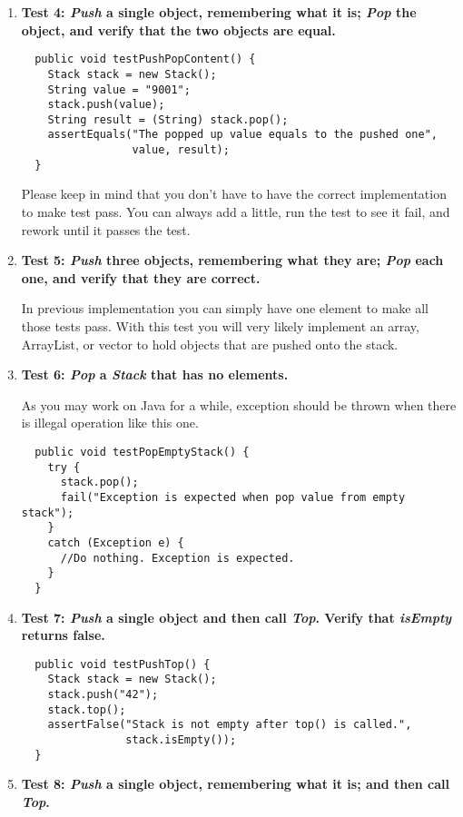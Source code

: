 \begin{enumerate}
\item {\textbf{Test 4: {\em Push} a single object, remembering what it is; {\em Pop} the object, and verify that the two objects are equal.}}

{\small\begin{verbatim}
  public void testPushPopContent() {	
    Stack stack = new Stack();
    String value = "9001";
    stack.push(value);
    String result = (String) stack.pop();
    assertEquals("The popped up value equals to the pushed one", 
                 value, result);
  }
\end{verbatim}}

Please keep in mind that you don't have to have the correct
implementation to make test pass. You can always add a little, run the
test to see it fail, and rework until it passes the test.

\item {\textbf{Test 5: {\em Push} three objects, remembering what they are; {\em Pop} each one, and verify that they are correct.}}

In previous implementation you can simply have one element to make all
those tests pass. With this test you will very likely implement an
array, ArrayList, or vector to hold objects that are pushed onto the
stack.

\item {\textbf{Test 6: {\em Pop} a {\em Stack} that has no elements.}}

As you may work on Java for a while, exception should be thrown when
there is illegal operation like this one.
{\small\begin{verbatim}
  public void testPopEmptyStack() {
    try {
      stack.pop();
      fail("Exception is expected when pop value from empty stack"); 
    }
    catch (Exception e) {
      //Do nothing. Exception is expected.
    }  
  }
\end{verbatim}}

\item {\textbf{Test 7: {\em Push} a single object and then call {\em Top}. Verify that {\em isEmpty} returns false.}}

{\small\begin{verbatim}
  public void testPushTop() {
    Stack stack = new Stack();
    stack.push("42");
    stack.top();
    assertFalse("Stack is not empty after top() is called.", 
                stack.isEmpty());
  }
\end{verbatim}}

\item {\textbf{Test 8: {\em Push} a single object, remembering what it is; and then call {\em Top}.}}


\end{enumerate}

